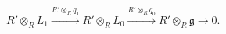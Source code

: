 \(\displaystyle
R'\otimes_R L_1
  \xrightarrow{R'\otimes_R q_1}
R'\otimes_R L_0
  \xrightarrow{R'\otimes_R q_0}
R'\otimes_R\mathfrak g
  \longrightarrow 0 .
\)
